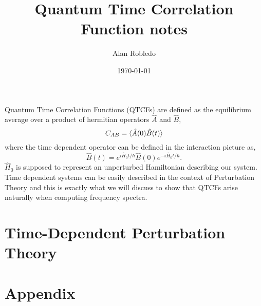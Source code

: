 \documentclass{article}
\title{Quantum Time Correlation Function notes}
\date{\today}
\author{Alan Robledo}
\newcommand{\be}{\begin{equation*}}
\newcommand{\ee}{\end{equation*}}
\begin{document}
\maketitle
Quantum Time Correlation Functions (QTCFs) are defined as the equilibrium average over a product of hermitian operators $\hat{A}$ and $\hat{B}$,
\be
  C_{AB} = \braket{\hat{A}(0) \hat{B}(t)}
\ee
where the time dependent operator can be defined in the interaction picture as,
\be
  \hat{B}(t) = e^{i \hat{H}_0 t/ \hbar} \hat{B}(0) e^{-i \hat{H}_0 t/ \hbar} .
\ee
$\hat{H}_0$ is supposed to represent an unperturbed Hamiltonian describing our system. Time dependent systems can be easily described in the context of Perturbation Theory and this is exactly what we will discuss to show that QTCFs arise naturally when computing frequency spectra.
\section{Time-Dependent Perturbation Theory}

\section{Appendix}
\end{document}
